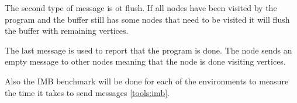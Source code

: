 The second type of message is ot flush. If all nodes have been visited by the program and the buffer still has some nodes that need to be visited it will flush the buffer with remaining vertices.

The last message is used to report that the program is done. The node sends an empty message to other nodes meaning that the node is done visiting vertices.

Also the IMB benchmark will be done for each of the environments to measure the time it takes to send messages \ref{tools:imb}.


    

